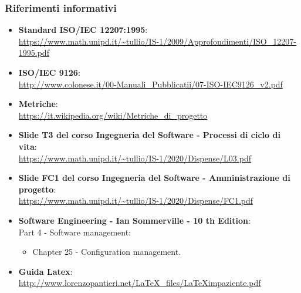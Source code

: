 \subsubsection{Riferimenti informativi}
\begin{itemize}
	\item \textbf{Standard ISO/IEC 12207:1995}: \\
	\textcolor{blue}{\url{https://www.math.unipd.it/~tullio/IS-1/2009/Approfondimenti/ISO_12207-1995.pdf}}
	\item \textbf{ISO/IEC 9126}: \\
	\textcolor{blue}{\url{http://www.colonese.it/00-Manuali_Pubblicatii/07-ISO-IEC9126_v2.pdf}}
	\item \textbf{Metriche}:\\ \textcolor{blue}{\url{https://it.wikipedia.org/wiki/Metriche_di_progetto}}
		\item \textbf{Slide T3 del corso Ingegneria del Software - Processi di ciclo di vita}:\\
	\textcolor{blue}{\url{https://www.math.unipd.it/~tullio/IS-1/2020/Dispense/L03.pdf}}
	
	\item \textbf{Slide FC1 del corso Ingegneria del Software - Amministrazione di progetto}:\\
	\textcolor{blue}{\url{https://www.math.unipd.it/~tullio/IS-1/2020/Dispense/FC1.pdf}}
	
	\item \textbf{Software Engineering - Ian Sommerville - 10 th Edition}: \\
	Part 4 - Software management:
	\begin{itemize}
	\item Chapter 25 - Configuration management.
	\end{itemize}
		
	\item \textbf{Guida Latex}:\\ \textcolor{blue}{\url{http://www.lorenzopantieri.net/LaTeX_files/LaTeXimpaziente.pdf}}
	
	
\end{itemize}

	


